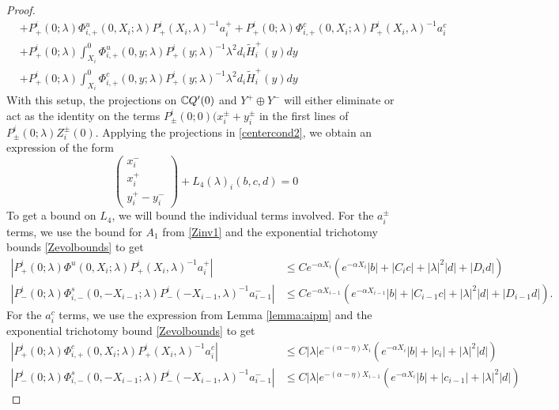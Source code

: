 \documentclass[thesis.tex]{subfiles}
\begin{document}
\begin{lemma}
\begin{proof}
\begin{align*}
&+ P^i_+(0; \lambda) \Phi^u_{i,+}(0, X_i; \lambda) P^i_+(X_i, \lambda)^{-1} a_i^+ + P^i_+(0; \lambda) \Phi^c_{i,+}(0, X_i; \lambda) P^i_+(X_i, \lambda)^{-1} a_i^c \\
&+ P^i_+(0; \lambda) \int_{X_i}^0 \Phi^u_{i,+}(0, y; \lambda) P^i_+(y; \lambda)^{-1} \lambda^2 d_i \tilde{H}_i^+(y) dy \\
&+ P^i_+(0; \lambda) \int_{X_i}^0 \Phi^c_{i,+}(0, y; \lambda) P^i_+(y; \lambda)^{-1} \lambda^2 d_i \tilde{H}_i^+(y) dy 
\end{align*}
With this setup, the projections on $\mathbb{C} Q'(0)$ and $Y^+ \oplus Y^-$ will either eliminate or act as the identity on the terms $P^i_\pm(0; 0)(x_i^\pm + y_i^\pm$ in the first lines of $P^i_\pm(0; \lambda) Z_i^\pm(0)$. Applying the projections in \eqref{centercond2}, we obtain an expression of the form
\begin{equation}\label{projxy}
\begin{pmatrix}x_i^- \\ x_i^+ \\ 
y_i^+ - y_i^- \end{pmatrix} + L_4(\lambda)_i(b, c, d) = 0
\end{equation}
To get a bound on $L_4$, we will bound the individual terms involved. For the $a_i^\pm$ terms, we use the bound for $A_1$ from \cref{Zinv1} and the exponential trichotomy bounds \cref{Zevolbounds} to get
\begin{align*}
|P^i_+(0; \lambda) \Phi^u(0, X_i; \lambda) P^i_+(X_i, \lambda)^{-1} a_i^+| 
&\leq C e^{-\alpha X_i} \left( e^{-\alpha X_i} |b| + |C_i c| + |\lambda|^2 |d| + |D_i d| \right) \\
|P^i_-(0; \lambda) \Phi^s_{i,-}(0, -X_{i-1}; \lambda) P^i_-(-X_{i-1}, \lambda)^{-1} a_{i-1}^-| &\leq C e^{-\alpha X_{i-1}} \left( e^{-\alpha X_{i-1}} |b| + |C_{i-1} c| + |\lambda|^2 |d| + |D_{i-1} d| \right).
\end{align*}
For the $a_i^c$ terms, we use the expression from Lemma \ref{lemma:aipm} and the exponential trichotomy bound \cref{Zevolbounds} to get
\begin{align*}
|P^i_+(0; \lambda) \Phi^c_{i,+}(0, X_i; \lambda) P^i_+(X_i, \lambda)^{-1} a_i^c| &\leq C |\lambda| e^{-(\alpha - \eta) X_i} \left( e^{-\alpha X_i}  |b| + |c_i| +|\lambda|^2 |d| \right)\\
|P^i_-(0; \lambda) \Phi^s_{i,-}(0, -X_{i-1}; \lambda) P^i_-(-X_{i-1}, \lambda)^{-1} a_{i-1}^-| &\leq C |\lambda| e^{-(\alpha - \eta) X_{i-1}} \left( e^{-\alpha X_i}  |b| + |c_{i-1}| +|\lambda|^2 |d| \right)
\end{align*}

\end{proof}
\end{lemma}
\end{document}
